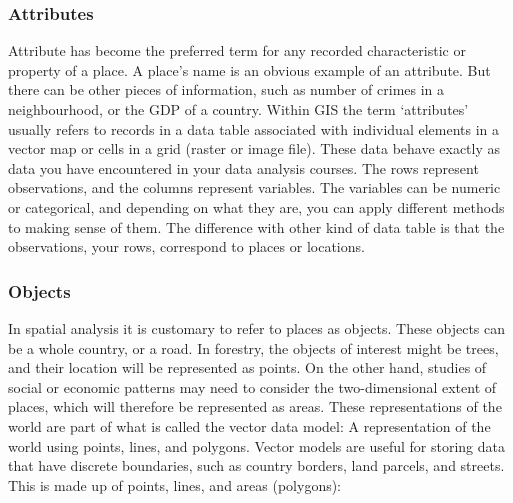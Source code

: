 \documentclass[]{book}
\begin{document}
\hypertarget{attributes}{%
\subsubsection{Attributes}\label{attributes}}

Attribute has become the preferred term for any recorded characteristic or property of a place. A place's name is an obvious example of an attribute. But there can be other pieces of information, such as number of crimes in a neighbourhood, or the GDP of a country. Within GIS the term `attributes' usually refers to records in a data table associated with individual elements in a vector map or cells in a grid (raster or image file). These data behave exactly as data you have encountered in your data analysis courses. The rows represent observations, and the columns represent variables. The variables can be numeric or categorical, and depending on what they are, you can apply different methods to making sense of them. The difference with other kind of data table is that the observations, your rows, correspond to places or locations.

\hypertarget{objects}{%
\subsubsection{Objects}\label{objects}}

In spatial analysis it is customary to refer to places as objects. These objects can be a whole country, or a road. In forestry, the objects of interest might be trees, and their location will be represented as points. On the other hand, studies of social or economic patterns may need to consider the two-dimensional extent of places, which will therefore be represented as areas. These representations of the world are part of what is called the vector data model: A representation of the world using points, lines, and polygons. Vector models are useful for storing data that have discrete boundaries, such as country borders, land parcels, and streets. This is made up of points, lines, and areas (polygons):
\end{document}
